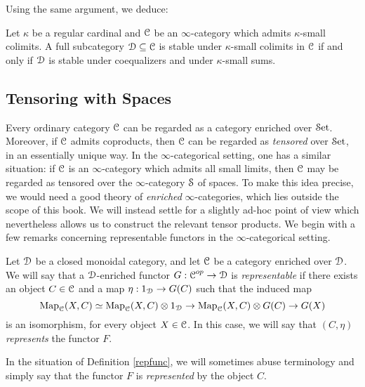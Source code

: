 Using the same argument, we deduce:

\begin{proposition}\label{appendicites}
Let $\kappa$ be a regular cardinal and $\operatorname{\mathcal{C}}$ be an $\infty$-category which admits $\kappa$-small colimits. A full subcategory $\operatorname{\mathcal{D}} \subseteq \operatorname{\mathcal{C}}$ is stable under $\kappa$-small colimits in $\operatorname{\mathcal{C}}$ if and only if $\operatorname{\mathcal{D}}$ is stable under coequalizers and under $\kappa$-small sums.
\end{proposition}

\subsection{Tensoring with Spaces}\label{quasilimit7}

Every ordinary category $\operatorname{\mathcal{C}}$ can be regarded as a category enriched over $\operatorname{\mathcal{S}et}$.
Moreover, if $\operatorname{\mathcal{C}}$ admits coproducts, then $\operatorname{\mathcal{C}}$ can be regarded as {\em tensored} over $\operatorname{\mathcal{S}et}$, in an essentially unique way. In the $\infty$-categorical setting, one has a similar situation: if $\operatorname{\mathcal{C}}$ is an $\infty$-category which admits all small limits, then $\operatorname{\mathcal{C}}$ may be regarded as tensored over the $\infty$-category $\operatorname{\mathcal{S}}$ of spaces. To make this idea precise, we would need a good theory of {\em enriched} $\infty$-categories, which lies outside the scope of this book. We will instead settle for a slightly ad-hoc point of view which nevertheless allows us to construct the relevant tensor products. We begin with a few remarks concerning representable functors in the $\infty$-categorical setting.

\begin{definition}\label{repfunc}
Let $\operatorname{\mathcal{D}}$ be a closed monoidal category, and let $\operatorname{\mathcal{C}}$ be a category enriched over $\operatorname{\mathcal{D}}$.
We will say that a $\operatorname{\mathcal{D}}$-enriched functor $G: \operatorname{\mathcal{C}}^{op} \rightarrow \operatorname{\mathcal{D}}$ is {\it representable} if there exists an object $C \in \operatorname{\mathcal{C}}$ and a map $\eta: 1_{\operatorname{\mathcal{D}}} \rightarrow G(C)$ such that the induced map
$$ \operatorname{{Map}}_{\operatorname{\mathcal{C}}}(X,C) \simeq \operatorname{{Map}}_{\operatorname{\mathcal{C}}}(X,C) \otimes 1_{\operatorname{\mathcal{D}}}
\rightarrow \operatorname{{Map}}_{\operatorname{\mathcal{C}}}(X,C) \otimes G(C) \rightarrow G(X)$$
is an isomorphism, for every object $X \in \operatorname{\mathcal{C}}$. In this case, we will say that 
$(C,\eta)$ {\it represents} the functor $F$. 
\end{definition}

\begin{remark}
In the situation of Definition \ref{repfunc}, we will sometimes abuse terminology and simply say that the functor $F$ is {\it represented} by the object $C$.
\end{remark}

